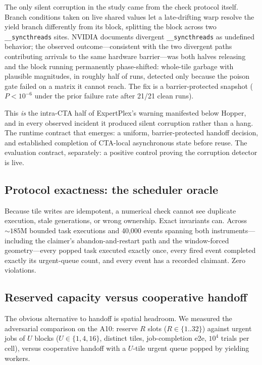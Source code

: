 \documentclass[11pt]{article}
\begin{document}
The only silent corruption in the study came from the check protocol
itself. Branch conditions taken on live shared values let a
late-drifting warp resolve the yield branch differently from its
block, splitting the block across two \texttt{\_\_syncthreads} sites.
NVIDIA documents divergent \texttt{\_\_syncthreads} as undefined
behavior; the observed outcome---consistent with the two divergent
paths contributing arrivals to the same hardware barrier---was both
halves releasing and the block running permanently phase-shifted:
whole-tile garbage with plausible magnitudes, in roughly half of
runs, detected only because the poison gate failed on a matrix it
cannot reach. The fix is a barrier-protected snapshot
($P{<}10^{-6}$ under the prior failure rate after 21/21 clean runs).

This \emph{is} the intra-CTA half of ExpertPlex's warning manifested
below Hopper, and in every observed incident it produced silent
corruption rather than a hang. The runtime contract that emerges: a
uniform, barrier-protected handoff decision, and established
completion of CTA-local asynchronous state before reuse. The
evaluation contract, separately: a positive control proving the
corruption detector is live.

\subsection{Protocol exactness: the scheduler oracle}
\label{sec:oracle}

Because tile writes are idempotent, a numerical check cannot see
duplicate execution, stale generations, or wrong ownership. Exact
invariants can. Across ${\sim}185$M bounded task executions and
40{,}000 events spanning both instruments---including the claimer's
abandon-and-restart path and the window-forced geometry---every
popped task executed exactly once, every fired event completed
exactly its urgent-queue count, and every event has a recorded
claimant. Zero violations.

\subsection{Reserved capacity versus cooperative handoff}
\label{sec:pareto}

The obvious alternative to handoff is spatial headroom. We measured
the adversarial comparison on the A10: reserve $R$ slots
($R \in \{1..32\}$) against urgent jobs of $U$ blocks
($U \in \{1,4,16\}$, distinct tiles, job-completion e2e, $10^4$
trials per cell), versus cooperative handoff with a $U$-tile urgent
queue popped by yielding workers.
\end{document}
